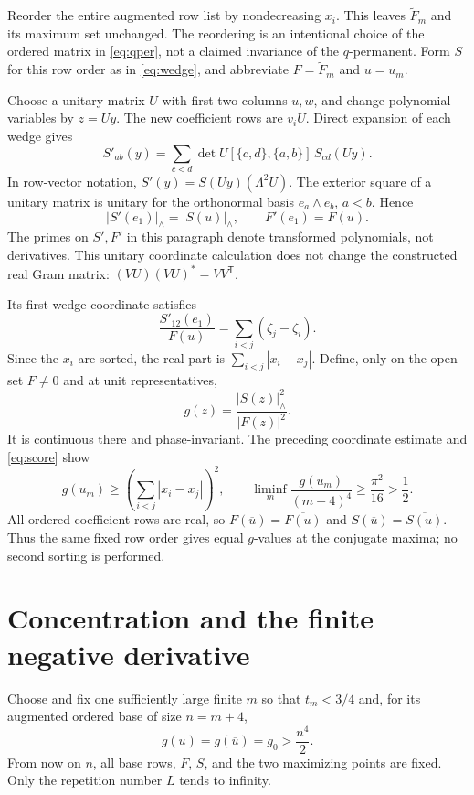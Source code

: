 \documentclass[11pt]{article}
\theoremstyle{remark}
\newcommand{\normW}[1]{\lvert #1\rvert_{\wedge}}
\begin{document}
Reorder the entire augmented row list by nondecreasing $x_i$. This leaves $\widetilde F_m$ and its maximum set unchanged. The reordering is an intentional choice of the ordered matrix in \eqref{eq:qper}, not a claimed invariance of the $q$-permanent. Form $S$ for this row order as in \eqref{eq:wedge}, and abbreviate $F=\widetilde F_m$ and $u=u_m$.

Choose a unitary matrix $U$ with first two columns $u,w$, and change polynomial variables by $z=Uy$. The new coefficient rows are $v_iU$. Direct expansion of each wedge gives
\begin{equation}\label{eq:exterior}
 S'_{ab}(y)=\sum_{c<d}\det U[\{c,d\},\{a,b\}]\,S_{cd}(Uy).
\end{equation}
In row-vector notation, $S'(y)=S(Uy)(\Lambda^2U)$. The exterior square of a unitary matrix is unitary for the orthonormal basis $e_a\wedge e_b$, $a<b$. Hence
\[
 \normW{S'(e_1)}=\normW{S(u)},\qquad F'(e_1)=F(u).
\]
The primes on $S',F'$ in this paragraph denote transformed polynomials, not derivatives. This unitary coordinate calculation does not change the constructed real Gram matrix: $(VU)(VU)^*=VV^{\mathsf T}$.

Its first wedge coordinate satisfies
\[
 \frac{S'_{12}(e_1)}{F(u)}=\sum_{i<j}(\zeta_j-\zeta_i).
\]
Since the $x_i$ are sorted, the real part is $\sum_{i<j}|x_i-x_j|$. Define, only on the open set $F\ne0$ and at unit representatives,
\begin{equation}\label{eq:g}
 g(z)=\frac{\normW{S(z)}^2}{|F(z)|^2}.
\end{equation}
It is continuous there and phase-invariant. The preceding coordinate estimate and \eqref{eq:score} show
\begin{equation}\label{eq:threshold}
 g(u_m)\geq\left(\sum_{i<j}|x_i-x_j|\right)^2,
 \qquad
 \liminf_m\frac{g(u_m)}{(m+4)^4}\geq\frac{\pi^2}{16}>\frac12.
\end{equation}
All ordered coefficient rows are real, so $F(\overline u)=\overline{F(u)}$ and $S(\overline u)=\overline{S(u)}$. Thus the same fixed row order gives equal $g$-values at the conjugate maxima; no second sorting is performed.

\section{Concentration and the finite negative derivative}
Choose and fix one sufficiently large finite $m$ so that $t_m<3/4$ and, for its augmented ordered base of size $n=m+4$,
\begin{equation}\label{eq:fixed}
 g(u)=g(\overline u)=g_0>\frac{n^4}{2}.
\end{equation}
From now on $n$, all base rows, $F$, $S$, and the two maximizing points are fixed. Only the repetition number $L$ tends to infinity.
\end{document}
